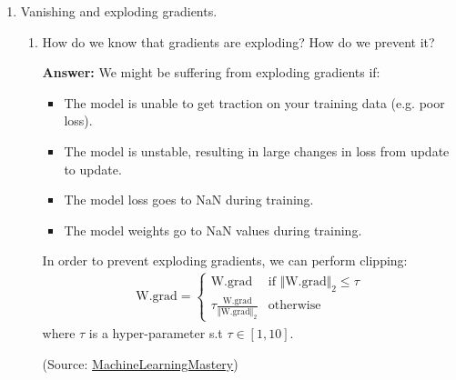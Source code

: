 \documentclass{article}
\newenvironment{QandA}{\begin{enumerate}[label=\arabic*.]}{\end{enumerate}}
\newenvironment{InnerQandA}{\begin{enumerate}[label=\roman*.]}{\end{enumerate}}
\newenvironment{answer}{\par\normalfont \textbf{Answer:}}{}
\begin{document}
\begin{QandA}
    \item Vanishing and exploding gradients.
    \begin{InnerQandA}
        \item How do we know that gradients are exploding? How do we prevent it?
        \begin{answer}
            We might be suffering from exploding gradients if:
            \begin{itemize}
                \item The model is unable to get traction on your training data (e.g. poor loss).
                \item The model is unstable, resulting in large changes in loss from update to update.
                \item The model loss goes to NaN during training.
                \item The model weights go to NaN values during training.
            \end{itemize}
            In order to prevent exploding gradients, we can perform clipping:
            \begin{align*}
                \text{W.grad} = \begin{cases}
                  \text{W.grad} & \text{if } \Vert \text{W.grad} \Vert_2 \le \tau \\
                  \tau \frac{\text{W.grad}}{\Vert \text{W.grad} \Vert_2} & \text{otherwise}
                \end{cases}
            \end{align*}
            where $\tau$ is a hyper-parameter s.t $\tau \in \left[1, 10\right]$.

            (Source: \href{https://machinelearningmastery.com/exploding-gradients-in-neural-networks/}{MachineLearningMastery})
        \end{answer}


\end{InnerQandA}
\end{QandA}
\end{document}
